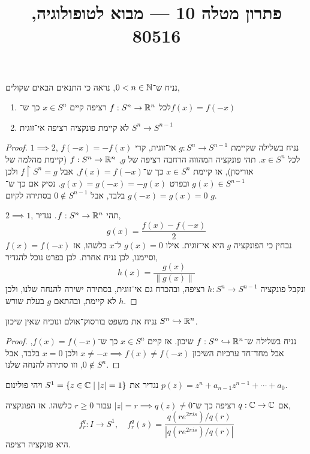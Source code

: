 
\title{פתרון מטלה 10 --- מבוא לטופולוגיה, 80516}

\usepackage{pgfplots}
\pgfplotsset{width=7cm,compat=1.18}


\maketitle
\maketitleprint[purple]

\question{}
נניח ש־$0 < n \in \mathbb{N}$,
נראה כי התנאים הבאים שקולים,
\begin{enumerate}
	\item לכל $f : S^n \to \mathbb{R}^n$ רציפה קיים $x \in S^n$ כך ש־$f(x) = f(-x)$
	\item לא קיימת פונקציה רציפה אי־זוגית $S^n \to S^{n - 1}$
\end{enumerate}
\begin{proof}
	$1 \implies 2$,
	נניח בשלילה שקיימת $g : S^n \to S^{n - 1}$ אי־זוגית, קרי $f(-x) = -f(x)$ לכל $x \in S^n$.
	תהי פונקציה המהווה הרחבה רציפה של $g$, $f : S^n \to \mathbb{R}^n$ (קיימת מהלמה של אוריסון), אז קיימת $x \in S^n$ כך ש־$f(x) = f(-x)$, אבל $f \restriction S^n = g$ ולכן $g(x) \in S^{n - 1}$ ובפרט $g(x) = g(-x) = -g(x)$.
	נסיק אם כך ש־$g(-x) = g(x) = 0$ בלבד, אבל $0 \notin S^{n - 1}$ בסתירה לקיום $g$.

	$2 \implies 1$,
	תהי $f : S^n \to \mathbb{R}^n$.
	נגדיר,
	\[
		g(x)
		= \frac{f(x) - f(-x)}{2}
	\]
	נבחין כי הפונקציה $g$ היא אי־זוגית.
	אילו $g(x) = 0$ ל־$x$ כלשהו, אז $f(x) = f(-x)$ וסיימנו, לכן נניח אחרת.
	לכן בפרט נוכל להגדיר,
	\[
		h(x)
		= \frac{g(x)}{\lVert g(x) \rVert}
	\]
	ונקבל פונקציה $h : S^n \to S^{n - 1}$ רציפה, ובהכרח גם אי־זוגית, בסתירה ישירה להנחה שלנו, ולכן $h$ לא קיימת, ובהתאם $g$ בעלת שורש.
\end{proof}

\question{}
נניח את משפט בורסוק־אולם ונוכיח שאין שיכון $S^n \hookrightarrow \mathbb{R}^n$.
\begin{proof}
	נניח בשלילה ש־$f : S^n \hookrightarrow \mathbb{R}^n$ שיכון.
	אז קיים $x \in S^n$ כך ש־$f(x) = f(-x)$, אבל מחד־חד ערכיות השיכון $x \ne -x \implies f(x) \ne f(-x)$ ולכן $x = 0$ בלבד, אבל $0 \notin S^n$, וזו סתירה להנחה שלנו.
\end{proof}

\question{}
נגדיר את $S^1 = \{ z \in \mathbb{C} \mid |z| = 1 \}$ ויהי פולינום $p(z) = z^n + a_{n - 1} z^{n - 1} + \cdots + a_0$.

\subquestion{}
אם $q : \mathbb{C} \to \mathbb{C}$ רציפה כך ש־$|z| = r \implies q(z) \ne 0$ עבור $r \ge 0$ כלשהו.
אז הפונקציה,
\[
	f_r^q : I \to S^1,
	\quad
	f_r^q(s)
	= \frac{q(r e^{2 \pi i s}) / q(r)}{|q(r e^{2 \pi i s}) / q(r)|}
\]
היא פונקציה רציפה.

